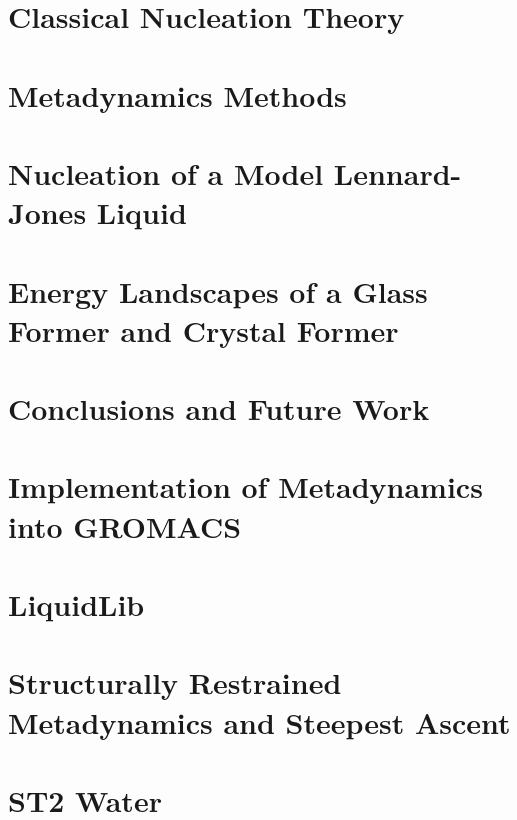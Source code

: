 \documentclass[edeposit,fullpage, centerchapter]{uiucthesis2009}
\begin{document}
\chapter{Classical Nucleation Theory}


\chapter{Metadynamics Methods}
\label{metadynamics}


\chapter{Nucleation of a Model Lennard-Jones Liquid}


\chapter{Energy Landscapes of a Glass Former and Crystal Former}
\label{compare landscapes}


\chapter{Conclusions and Future Work}


\appendix
\chapter{Implementation of Metadynamics into GROMACS}
\label{code}


\chapter{LiquidLib}


\chapter{Structurally Restrained Metadynamics and Steepest Ascent}


\chapter{ST2 Water}


\backmatter


\end{document}
